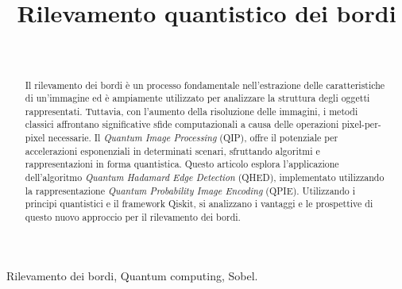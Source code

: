 \documentclass[journal, draft]{IEEEtran}
\begin{document}
\title{Rilevamento quantistico dei bordi}

\author{
\\

}

\maketitle

\begin{abstract}
	Il rilevamento dei bordi è un processo fondamentale nell'estrazione delle 
	caratteristiche di un'immagine ed è ampiamente utilizzato per analizzare 
	la struttura degli oggetti rappresentati. Tuttavia, con l'aumento della 
	risoluzione delle immagini, i metodi classici affrontano significative 
	sfide computazionali a causa delle operazioni pixel-per-pixel necessarie. 
	Il \emph{Quantum Image Processing} (QIP), offre il potenziale per accelerazioni 
	esponenziali in determinati scenari, sfruttando algoritmi e rappresentazioni 
	in forma quantistica. Questo articolo esplora l'applicazione dell'algoritmo 
	\emph{Quantum Hadamard Edge Detection} (QHED), implementato utilizzando la 
	rappresentazione \emph{Quantum Probability Image Encoding} (QPIE). 
	Utilizzando i principi quantistici e il framework Qiskit, si analizzano 
	i vantaggi e le prospettive di questo nuovo approccio per il rilevamento dei bordi.
\end{abstract}

\begin{IEEEkeywords}
Rilevamento dei bordi, Quantum computing, Sobel.
\end{IEEEkeywords}









\end{document}
